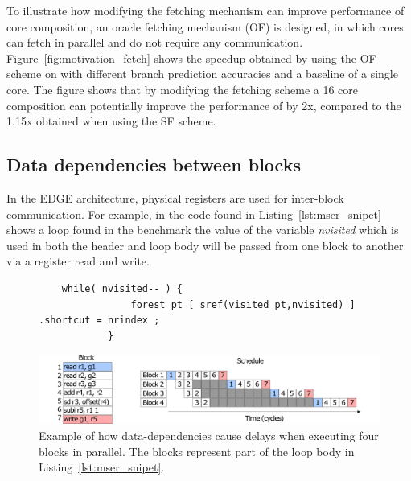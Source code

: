 To illustrate how modifying the fetching mechanism can improve performance of core composition, an oracle fetching mechanism (OF) is designed, in which cores can fetch in parallel and do not require any communication.
Figure~\ref{fig:motivation_fetch} shows the speedup obtained by using the OF scheme on  with different branch prediction accuracies and a baseline of a single core.
The figure shows that by modifying the fetching scheme a 16 core composition can potentially improve the performance of  by 2x, compared to the 1.15x obtained when using the SF scheme.

\subsection{Data dependencies between blocks}

In the EDGE architecture, physical registers are used for inter-block communication.
For example, in the code found in Listing~\ref{lst:mser_snipet} shows a loop found in the  benchmark the value of the variable \textit{nvisited} which is used in both the header and loop body will be passed from one block to another via a register read and write.


\begin{figure}[t]
\lstset{language=C,numbersep=4pt}
\begin{center}
\begin{lstlisting}
	while( nvisited-- ) {
				forest_pt [ sref(visited_pt,nvisited) ] .shortcut = nrindex ;
			}
\end{lstlisting}
\end{center}
\vspace{-2em}
\label{lst:mser_snipet}
    \centering
    \includegraphics[width=1\textwidth]{chapter3/graphics/mser_ex.pdf}
    \caption{Example of how data-dependencies cause delays when executing four blocks in parallel. The blocks represent part of the loop body in Listing~\ref{lst:mser_snipet}.}
    \label{fig:mser_nvsited}
	\vspace{1em}
\end{figure}

